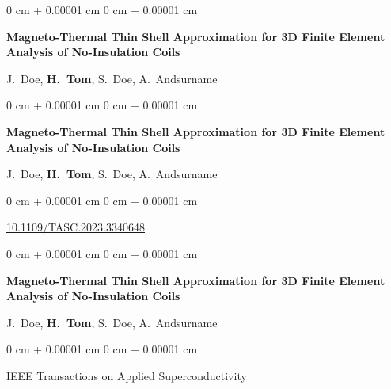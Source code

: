\documentclass[10pt, letterpaper]{article}
\newenvironment{onecolentry}{
    \begin{adjustwidth}{
        0 cm + 0.00001 cm
    }{
        0 cm + 0.00001 cm
    }
}{
    \end{adjustwidth}
} %
\begin{document}
        
        \begin{samepage}
            \begin{onecolentry}
                \textbf{Magneto-Thermal Thin Shell Approximation for 3D Finite Element Analysis of No-Insulation Coils}

                \vspace{0.10 cm}

                \mbox{J. Doe}, \mbox{\textbf{H. Tom}}, \mbox{S. Doe}, \mbox{A. Andsurname}
            \end{onecolentry}


        \end{samepage}

        \vspace{0.2 cm}

        \begin{samepage}
            \begin{onecolentry}
                \textbf{Magneto-Thermal Thin Shell Approximation for 3D Finite Element Analysis of No-Insulation Coils}

                \vspace{0.10 cm}

                \mbox{J. Doe}, \mbox{\textbf{H. Tom}}, \mbox{S. Doe}, \mbox{A. Andsurname}
            \end{onecolentry}


            \vspace{0.10 cm}

            \begin{onecolentry}
        \href{https://doi.org/10.1109/TASC.2023.3340648}{10.1109/TASC.2023.3340648}    \end{onecolentry}
        \end{samepage}

        \vspace{0.2 cm}

        \begin{samepage}
            \begin{onecolentry}
                \textbf{Magneto-Thermal Thin Shell Approximation for 3D Finite Element Analysis of No-Insulation Coils}

                \vspace{0.10 cm}

                \mbox{J. Doe}, \mbox{\textbf{H. Tom}}, \mbox{S. Doe}, \mbox{A. Andsurname}
            \end{onecolentry}


            \vspace{0.10 cm}

            \begin{onecolentry}
        IEEE Transactions on Applied Superconductivity    \end{onecolentry}
        \end{samepage}
\end{document}

